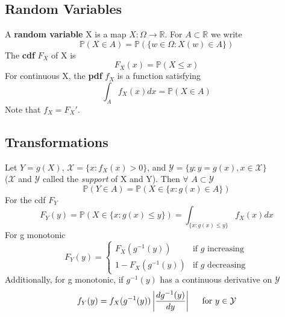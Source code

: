 \documentclass[10pt,twocolumn]{article}
\begin{document}
\subsection*{Random Variables}
A \textbf{random variable} X is a map $X:\Omega \rightarrow \mathbb{R}$. For $A \subset \mathbb{R}$ we write
\begin{equation}
\mathbb{P}(X \in A) = \mathbb{P}(\{ w \in \Omega : X(w) \in A \})
\end{equation}
The \textbf{cdf} $F_{X}$ of X is
\begin{equation}
F_{X}(x) = \mathbb{P}(X \leq x)
\end{equation}
For continuous X, the \textbf{pdf} $f_{X}$ is a function satisfying
\begin{equation}
\int_{A} f_{X}(x)dx = \mathbb{P}(X \in A)
\end{equation}
Note that $f_{X} = F_{X}'$.

\subsection*{Transformations}
Let $Y=g(X)$, $\mathcal{X} = \{x : f_{X}(x) > 0\}$, and $\mathcal{Y} = \{y : y=g(x), x \in \mathcal{X}\}$ \\($\mathcal{X}$ and $\mathcal{Y}$ called the \emph{support} of X and Y). Then $\forall$ $A \subset \mathcal{Y}$
\begin{equation}
\mathbb{P}(Y \in A) = \mathbb{P}(X \in \{x : g(x) \in A\})
\end{equation}
For the cdf $F_{Y}$
\begin{equation}
F_{Y}(y) = \mathbb{P}(X \in \{x : g(x) \leq y \}) = \int_{\{x : g(x) \leq y \}}f_{X}(x)dx
\end{equation}
For g monotonic
\begin{equation}
F_{Y}(y) =
\begin{cases}
F_{X}(g^{-1}(y))& \text{if $g$ increasing} \\
1 - F_{X}(g^{-1}(y))& \text{if $g$ decreasing}
\end{cases}
\end{equation}
Additionally, for g monotonic, if $g^{-1}(y)$ has a continuous derivative on $\mathcal{Y}$
\begin{equation}
f_{Y}(y) = f_{X}(g^{-1}(y)) \left | \frac{dg^{-1}(y)}{dy} \right | \hspace{5mm} \text{for $y \in \mathcal{Y}$}
\end{equation}
\end{document}

